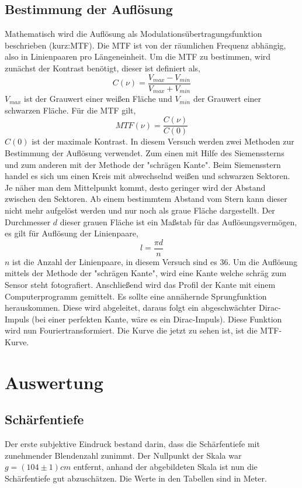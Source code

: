 \subsection{Bestimmung der Auflösung}
Mathematisch wird die Auflösung als Modulationsübertragungsfunktion beschrieben (kurz:MTF). Die MTF ist von der räumlichen Frequenz abhängig, also in Linienpaaren pro Längeneinheit. Um die MTF zu bestimmen, wird zunächst der Kontrast benötigt, dieser ist definiert als,
\begin{equation}
C(\nu)=\frac{V_{max}-V_{min}}{V_{max}+V_{min}}
\end{equation}
$ V_{max} $ ist der Grauwert einer weißen Fläche und $ V_{min} $ der Grauwert einer schwarzen Fläche. Für die MTF gilt,
\begin{equation}
MTF(\nu)=\frac{C(\nu)}{C(0)}
\end{equation}
$ C(0) $ ist der maximale Kontrast.
In diesem Versuch werden zwei Methoden zur Bestimmung der Auflösung verwendet. Zum einen mit Hilfe des Siemenssterns und zum anderen mit der Methode der "schrägen Kante".
Beim Siemensstern handel es sich um einen Kreis mit abwechselnd weißen und schwarzen Sektoren. Je näher man dem Mittelpunkt kommt, desto geringer wird der Abstand zwischen den Sektoren. Ab einem bestimmtem Abstand vom Stern kann dieser nicht mehr aufgelöst werden und nur noch als graue Fläche dargestellt. Der Durchmesser $ d $ dieser grauen Fläche ist ein Maßstab für das Auflösungsvermögen, es gilt für Auflösung der Linienpaare,
\begin{equation}
l=\frac{\pi d}{n}
\end{equation}
$ n $ ist die Anzahl der Linienpaare, in diesem Versuch sind es 36.
Um die Auflösung mittels der Methode der "schrägen Kante", wird eine Kante welche schräg zum Sensor steht fotografiert. Anschließend wird das Profil der Kante mit einem Computerprogramm gemittelt. Es sollte eine annähernde Sprungfunktion herauskommen. Diese wird abgeleitet, daraus folgt ein abgeschwächter Dirac-Impuls (bei einer perfekten Kante, wäre es ein Dirac-Impuls). Diese Funktion wird nun Fouriertransformiert.
Die Kurve die jetzt zu sehen ist, ist die MTF-Kurve.
\section{Auswertung}
\subsection{Schärfentiefe}
Der erste subjektive Eindruck bestand darin, dass die Schärfentiefe mit zunehmender Blendenzahl zunimmt.
Der Nullpunkt der Skala war  $ g=(104\pm1)cm $ entfernt, anhand der abgebildeten Skala ist nun die Schärfentiefe gut abzuschätzen.
Die Werte in den Tabellen sind in Meter.




